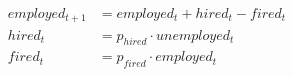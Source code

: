 \documentclass[preview]{standalone}
\begin{document}
\begin{align*}
employed_{t+1} &= employed_{t} + hired_{t} - fired_{t}\\ hired_t &= p_{hired} \cdot unemployed_t \\ fired_t &= p_{fired} \cdot employed_t
\end{align*}
\end{document}
